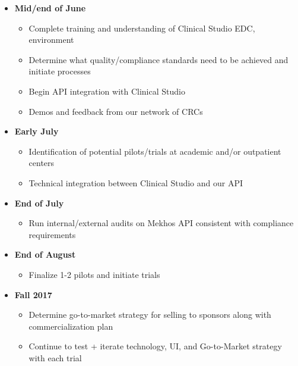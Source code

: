 \documentclass[12pt, oneside]{article}
\begin{document}
\begin{itemize}
\item \textbf{Mid/end of June} 
\begin{itemize}
\item Complete training and understanding of Clinical Studio EDC, environment
\item Determine what quality/compliance standards need to be achieved and initiate processes
\item Begin API integration with Clinical Studio
\item Demos and feedback from our network of CRCs
\end{itemize}

\newpage

\item \textbf{Early July}
\begin{itemize}
\item Identification of potential pilots/trials at academic and/or outpatient centers
\item Technical integration between Clinical Studio and our API
\end{itemize}

\item \textbf{End of July}
\begin{itemize}
\item Run internal/external audits on Mekhos API consistent with compliance requirements
\end{itemize}

\item \textbf{End of August}
\begin{itemize}
\item Finalize 1-2 pilots and initiate trials
\end{itemize}

\item \textbf{Fall 2017}
\begin{itemize}
\item Determine go-to-market strategy for selling to sponsors along with commercialization plan
\item Continue to test + iterate technology, UI, and Go-to-Market strategy with each trial
\end{itemize}

\end{itemize}
\end{document}
